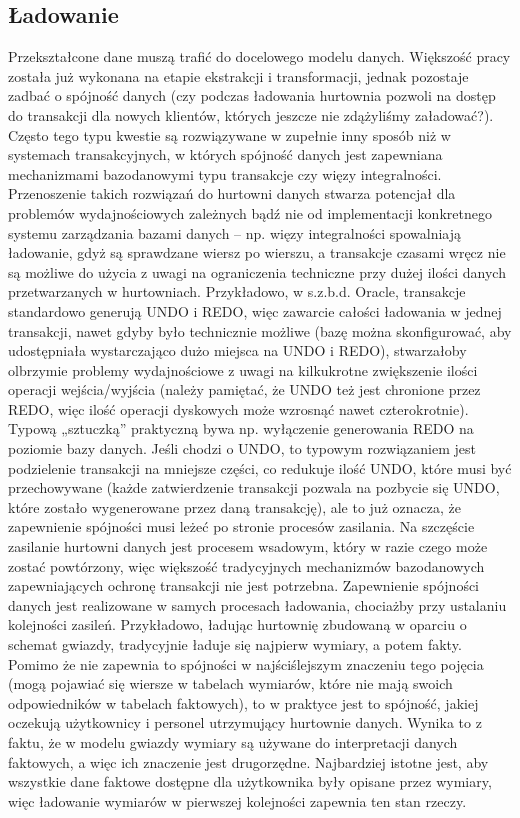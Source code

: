 \subsection{Ładowanie}
Przekształcone dane muszą trafić do docelowego modelu danych.
Większość pracy została już wykonana na etapie ekstrakcji i transformacji,
 jednak pozostaje zadbać o spójność danych 
(czy podczas ładowania hurtownia pozwoli na dostęp do transakcji dla nowych klientów, których jeszcze nie zdążyliśmy załadować?).
Często tego typu kwestie są rozwiązywane w zupełnie inny sposób niż w systemach transakcyjnych,
 w których spójność danych jest zapewniana mechanizmami bazodanowymi typu transakcje czy więzy integralności.
Przenoszenie takich rozwiązań do hurtowni danych stwarza potencjał dla problemów wydajnościowych zależnych bądź nie od implementacji
 konkretnego systemu zarządzania bazami danych – np. więzy integralności spowalniają ładowanie,
 gdyż są sprawdzane wiersz po wierszu, a transakcje czasami wręcz nie są możliwe do użycia 
 z uwagi na ograniczenia techniczne przy dużej ilości danych przetwarzanych w hurtowniach. 
Przykładowo, w s.z.b.d. Oracle, transakcje standardowo generują UNDO i REDO, więc zawarcie całości ładowania w jednej transakcji,
 nawet gdyby było technicznie możliwe (bazę można skonfigurować, aby udostępniała wystarczająco dużo miejsca na UNDO i REDO), 
 stwarzałoby olbrzymie problemy wydajnościowe z uwagi na kilkukrotne zwiększenie ilości operacji wejścia/wyjścia 
 (należy pamiętać, że UNDO też jest chronione przez REDO,
 więc ilość operacji dyskowych może wzrosnąć nawet czterokrotnie). 
Typową „sztuczką” praktyczną bywa np. wyłączenie generowania REDO na poziomie bazy danych. 
 Jeśli chodzi o UNDO, to typowym rozwiązaniem jest podzielenie transakcji na mniejsze części,
 co redukuje ilość UNDO, które musi być przechowywane (każde zatwierdzenie transakcji pozwala na pozbycie się UNDO,
 które zostało wygenerowane przez daną transakcję), 
 ale to już oznacza, że zapewnienie spójności musi leżeć po stronie procesów zasilania. 
Na szczęście zasilanie hurtowni danych jest procesem wsadowym, który w razie czego może zostać powtórzony,
 więc większość tradycyjnych mechanizmów bazodanowych zapewniających ochronę transakcji nie jest potrzebna. 
Zapewnienie spójności danych jest realizowane w samych procesach ładowania, 
 chociażby przy ustalaniu kolejności zasileń.
Przykładowo, ładując hurtownię zbudowaną w oparciu o schemat gwiazdy, 
 tradycyjnie ładuje się najpierw wymiary, 
 a potem fakty. Pomimo że nie zapewnia to spójności w najściślejszym znaczeniu tego pojęcia 
 (mogą pojawiać się wiersze w tabelach wymiarów, które nie mają swoich odpowiedników w tabelach faktowych), 
 to w praktyce jest to spójność, jakiej oczekują użytkownicy i personel utrzymujący hurtownie danych.
Wynika to z faktu, że w modelu gwiazdy wymiary są używane do interpretacji danych faktowych, a więc ich znaczenie jest drugorzędne. 
Najbardziej istotne jest, aby wszystkie dane faktowe dostępne dla użytkownika były opisane przez wymiary, 
więc ładowanie wymiarów w pierwszej kolejności zapewnia ten stan rzeczy. 


